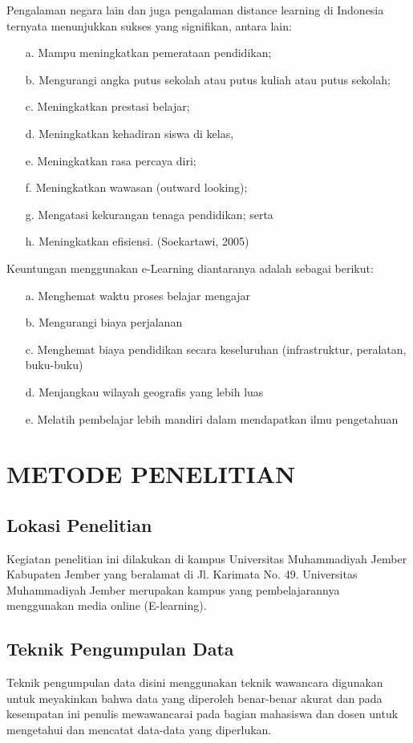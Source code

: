\documentclass{jtetiproposalskripsi}
\begin{document}
Pengalaman negara lain dan juga pengalaman distance learning di Indonesia ternyata menunjukkan sukses yang signifikan, antara lain: 
\begin{itemize}
\item[a.] Mampu meningkatkan pemerataan pendidikan;
\item[b.] Mengurangi angka putus sekolah atau putus kuliah atau putus sekolah;
\item[c.] Meningkatkan prestasi belajar;
\item[d.] Meningkatkan kehadiran siswa di kelas,
\item[e.] Meningkatkan rasa percaya diri; 
\item[f.] Meningkatkan wawasan (outward looking); 
\item[g.] Mengatasi kekurangan tenaga pendidikan; serta 
\item[h.] Meningkatkan efisiensi. (Soekartawi, 2005)
\end{itemize}
Keuntungan menggunakan e-Learning diantaranya adalah sebagai berikut: 
\begin{itemize}
\item[a.] Menghemat waktu proses belajar mengajar 
\item[b.] Mengurangi biaya perjalanan 
\item[c.] Menghemat biaya pendidikan secara keseluruhan (infrastruktur, peralatan, buku-buku) 
\item[d.] Menjangkau wilayah geografis yang lebih luas 
\item[e.] Melatih pembelajar lebih mandiri dalam mendapatkan ilmu pengetahuan
\end{itemize}

\chapter{METODE PENELITIAN}

\section{Lokasi Penelitian}
Kegiatan penelitian ini dilakukan di kampus Universitas Muhammadiyah Jember Kabupaten Jember yang beralamat di Jl. Karimata No. 49.
Universitas Muhammadiyah Jember merupakan kampus yang pembelajarannya menggunakan media online (E-learning).

\section{Teknik Pengumpulan Data}
Teknik pengumpulan data disini menggunakan teknik wawancara digunakan untuk meyakinkan bahwa data yang diperoleh benar-benar akurat dan pada kesempatan ini penulis mewawancarai pada bagian mahasiswa dan dosen untuk mengetahui dan mencatat data-data yang diperlukan. 
\end{document}
